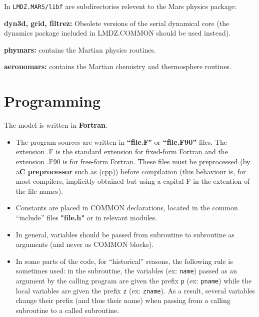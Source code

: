 \noindent In {\tt LMDZ.MARS/libf} are subdirectories relevent to the Mars physics package:
\begin{description}
\item{\bf dyn3d, grid, filtrez:} Obsolete versions of the serial dynamical core (the
dynamics package included in LMDZ.COMMON should be used instead).

\item{\bf phymars:} contains the Martian physics routines.

\item{\bf aeronomars:} contains the Martian chemistry and thermosphere routines.
\end{description}

\section{Programming}

The model is written in {\bf Fortran}.
\begin{itemize}
\item The program sources are written in {\bf ``file.F"} 
or {\bf ``file.F90''} files.
The extension .F is the standard extension for fixed-form Fortran and
the extension .F90 is for free-form Fortran.
These files must be preprocessed (by a{\bf C preprocessor}
such as (cpp)) before compilation (this behaviour is, for most
compilers, implicitly obtained but using a capital F in the extention
of the file names).

\item Constants are placed in COMMON declarations,
located in the common ``include'' files {\bf "file.h"} or in relevant modules.

\item In general, variables should be passed from subroutine to subroutine
as arguments (and never as COMMON blocks).

\item In some parts of the code, for ``historical'' reasons,
the following rule is sometimes used: in the subroutine,
the variables (ex: \verb+name+) passed as an argument by the calling program
are given the prefix \verb+p+ (ex: \verb+pname+)
 while the local variables are given the prefix \verb+z+ (ex: \verb+zname+).
As a result, several variables change their prefix (and thus their name)
when passing from a calling subroutine to a called subroutine. 
\end{itemize}

